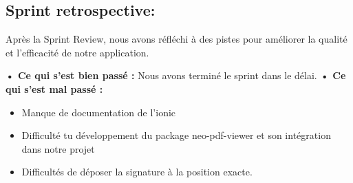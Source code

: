 \subsection{Sprint retrospective:}

Après la Sprint Review, nous avons réfléchi à des pistes pour améliorer la qualité et l'efficacité de notre application.


\noindent\textbf{•	Ce qui s'est bien passé :}
Nous avons terminé le sprint dans le délai.
\noindent\textbf{•	Ce qui s'est mal passé :}
\begin{itemize}
  \item Manque de documentation de l'ionic
  \item Difficulté tu développement du package neo-pdf-viewer et son intégration dans notre projet
  \item Difficultés de déposer la signature à la position exacte.
\end{itemize}

